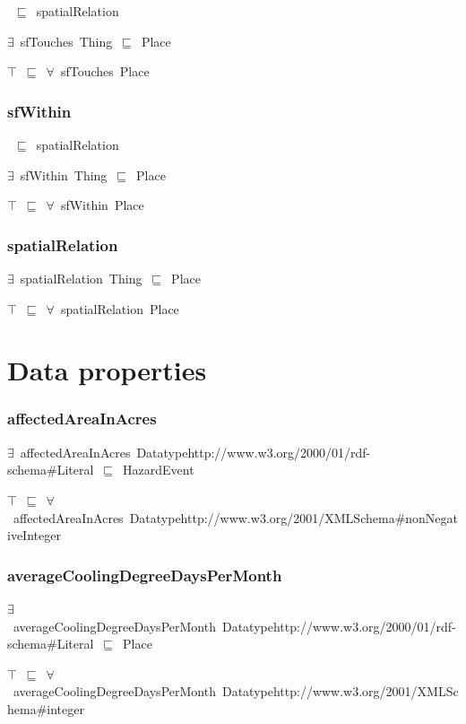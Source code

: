 \documentclass{article}
\begin{document}
~\ensuremath{\sqsubseteq}~spatialRelation

\ensuremath{\exists}~sfTouches~Thing~\ensuremath{\sqsubseteq}~Place

\ensuremath{\top}~\ensuremath{\sqsubseteq}~\ensuremath{\forall}~sfTouches~Place

\subsubsection*{sfWithin}

~\ensuremath{\sqsubseteq}~spatialRelation

\ensuremath{\exists}~sfWithin~Thing~\ensuremath{\sqsubseteq}~Place

\ensuremath{\top}~\ensuremath{\sqsubseteq}~\ensuremath{\forall}~sfWithin~Place

\subsubsection*{spatialRelation}

\ensuremath{\exists}~spatialRelation~Thing~\ensuremath{\sqsubseteq}~Place

\ensuremath{\top}~\ensuremath{\sqsubseteq}~\ensuremath{\forall}~spatialRelation~Place

\section*{Data properties}\subsubsection*{affectedAreaInAcres}

\ensuremath{\exists}~affectedAreaInAcres~Datatypehttp://www.w3.org/2000/01/rdf-schema#Literal~\ensuremath{\sqsubseteq}~HazardEvent

\ensuremath{\top}~\ensuremath{\sqsubseteq}~\ensuremath{\forall}~affectedAreaInAcres~Datatypehttp://www.w3.org/2001/XMLSchema#nonNegativeInteger

\subsubsection*{averageCoolingDegreeDaysPerMonth}

\ensuremath{\exists}~averageCoolingDegreeDaysPerMonth~Datatypehttp://www.w3.org/2000/01/rdf-schema#Literal~\ensuremath{\sqsubseteq}~Place

\ensuremath{\top}~\ensuremath{\sqsubseteq}~\ensuremath{\forall}~averageCoolingDegreeDaysPerMonth~Datatypehttp://www.w3.org/2001/XMLSchema#integer
\end{document}
